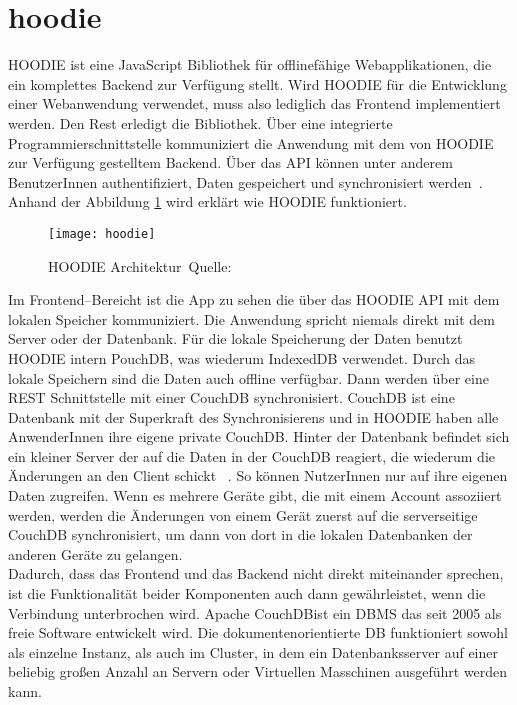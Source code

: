 \section{hoodie}
HOODIE ist eine JavaScript Bibliothek für offlinefähige Webapplikationen, die ein komplettes Backend zur Verfügung stellt.
Wird HOODIE für die Entwicklung einer Webanwendung verwendet, muss also lediglich das Frontend implementiert werden.
Den Rest erledigt die Bibliothek. Über eine integrierte Programmierschnittstelle kommuniziert die Anwendung mit dem von HOODIE zur Verfügung gestelltem Backend.
Über das \gls{API} können unter anderem BenutzerInnen authentifiziert, Daten gespeichert und synchronisiert werden~\cite{hoodie}.\\
Anhand der Abbildung \ref{fig:hoodie} wird erklärt wie HOODIE funktioniert.
%
\begin{figure}[H]
  \centering
  \texttt{[image: hoodie]}
  \grayRule
  \caption[HOODIE Architektur]{HOODIE Architektur~Quelle:~\cite{hoodie-how}}
  \label{fig:hoodie}
\end{figure}
%
Im Frontend--Bereicht ist die App zu sehen die über das HOODIE \gls{API} mit dem lokalen Speicher kommuniziert.
Die Anwendung spricht niemals direkt mit dem Server oder der Datenbank. Für die lokale Speicherung der Daten benutzt HOODIE intern PouchDB, was wiederum IndexedDB verwendet. Durch das lokale Speichern sind die Daten auch offline verfügbar. Dann werden über eine \gls{REST} Schnittstelle mit einer CouchDB synchronisiert.
CouchDB ist eine Datenbank mit der Superkraft des Synchronisierens und in HOODIE haben alle AnwenderInnen ihre eigene private CouchDB.
Hinter der Datenbank befindet sich ein kleiner Server der auf die Daten in der CouchDB reagiert, die wiederum die Änderungen an den Client schickt ~\cite{hoodie-how}.
So können NutzerInnen nur auf ihre eigenen Daten zugreifen. Wenn es mehrere Geräte gibt, die mit einem Account assoziiert werden, werden die Änderungen von einem Gerät zuerst auf die serverseitige CouchDB synchronisiert, um dann von dort in die lokalen Datenbanken der anderen Geräte zu gelangen.\\
Dadurch, dass das Frontend und das Backend nicht direkt miteinander sprechen, ist die Funktionalität beider Komponenten auch dann gewährleistet, wenn die Verbindung unterbrochen wird.
% 
Apache CouchDB\tm ist ein \gls{DBMS} das seit 2005 als freie Software entwickelt wird. Die dokumentenorientierte \gls{DB} funktioniert sowohl als einzelne Instanz, als auch im Cluster, in dem ein Datenbanksserver auf einer beliebig großen Anzahl an Servern oder Virtuellen Masschinen ausgeführt werden kann.\\
